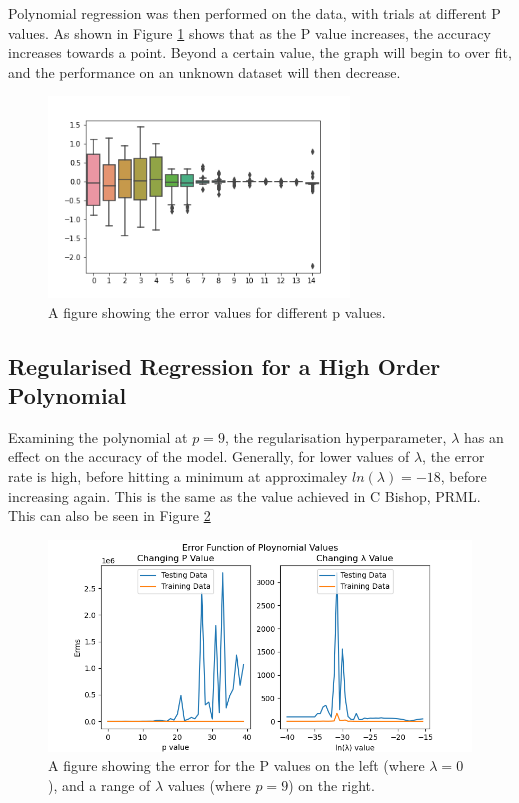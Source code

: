 \documentclass[a4paper, 11pt]{article}
\begin{document}
Polynomial regression was then performed on the data, with trials at different P values. As shown in Figure \ref{fig:pvalueboxplt} shows that as the P value increases, the accuracy increases towards a point. Beyond a certain value, the graph will begin to over fit, and the performance on an unknown dataset will then decrease.

\begin{figure}[h]
    \begin{center}
    \includegraphics[width=8cm]{fig/pvalueboxplot.png}
    \caption{A figure showing the error values for different p values.}
    \label{fig:pvalueboxplt}     
\end{center}
\end{figure}

\subsection{Regularised Regression for a High Order Polynomial}
\label{sec:changinglamda}

Examining the polynomial at $p=9$, the regularisation hyperparameter, $\lambda$ has an effect on the accuracy of the model. Generally, for lower values of $\lambda$, the error rate is high, before hitting a minimum at approximaley $ln(\lambda) = -18$, before increasing again. This is the same as the value achieved in C Bishop, PRML. This can also be seen in Figure \ref{fig:pandlamchange}
\begin{figure}[h]
    \begin{center}
    \includegraphics[width=16cm]{fig/displaypvalueplot.png}
    \caption{A figure showing the error for the P values on the left (where $\lambda=0$), and a range of $\lambda$ values (where $p=9$) on the right.}
    \label{fig:pandlamchange}     
\end{center}
\end{figure}
\end{document}
